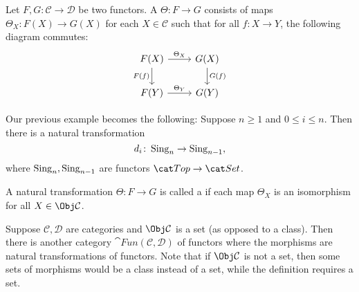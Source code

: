 \documentclass{standalone}
\begin{document}
\begin{definition}
  Let \(F, G \colon \mathcal C \to \mathcal D\) be two functors.
  A  \(\Theta \colon F \to G\) consists of
  maps \(\Theta_X \colon F(X) \to G(X)\) for each \(X \in \mathcal C\)
  such that for all \(f \colon X \to Y\), the following diagram commutes:
  \[
    \begin{tikzcd}
      F(X)\arrow[r, "\Theta_X"]\arrow[d, "F(f)", swap] &
        G(X)\arrow[d, "G(f)"] \\
      F(Y)\arrow[r, "\Theta_Y"] &
        G(Y)
    \end{tikzcd}
  \]
\end{definition}

\begin{example}
  Our previous example becomes the following:
  Suppose \(n \geq 1\) and \(0 \leq i \leq n\). Then there is
  a natural transformation
  \[
    d_i \colon \operatorname{Sing}_n \to \operatorname{Sing}_{n - 1},
  \]
  where \(\operatorname{Sing}_n, \operatorname{Sing}_{n-1}\) are functors \(\cTop \to \cSet\).
\end{example}

\begin{definition}
  A natural transformation \(\Theta \colon F \to G\) is called a
   if each map \(\Theta_X\) is an isomorphism
  for all \(X \in \Obj \mathcal C\).
\end{definition}

Suppose \(\mathcal C, \mathcal D\) are categories and
\(\Obj \mathcal C\) is a set (as opposed to a class).
Then there is another category \(\cat{Fun}(\mathcal C, \mathcal D)\)
of functors where the morphisms are natural transformations of functors.
Note that if \(\Obj \mathcal C\) is not a set, then some sets of morphisms
would be a class instead of a set, while the definition requires a set.
\end{document}
